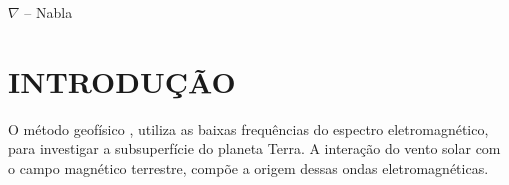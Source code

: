 \documentclass[12pt,twoside,oneright,a4paper,chapter=TITLE,english,brazil]{unipampa}
\begin{document}
\begin{simbolos}
    \item[$ \nabla $ -- ]       Nabla
\end{simbolos}


\tableofcontents       %


%
%
\textual                    %
\pagestyle{simple}          %

\chapter{INTRODUÇÃO}
    
     O método geofísico , utiliza as baixas frequências do espectro eletromagnético, para investigar a subsuperfície do planeta Terra. A interação do vento solar com o campo magnético terrestre, compõe a origem dessas ondas eletromagnéticas.  
    
\end{document}
